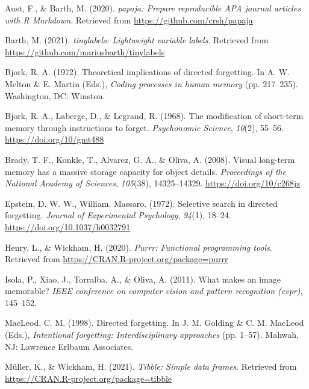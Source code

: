 \documentclass[
  english,
  man,floatsintext]{apa6}
\begin{document}
\leavevmode\hypertarget{ref-R-papaja}{}%
Aust, F., \& Barth, M. (2020). \emph{papaja: Prepare reproducible APA journal articles with R Markdown}. Retrieved from \url{https://github.com/crsh/papaja}

\leavevmode\hypertarget{ref-R-tinylabels}{}%
Barth, M. (2021). \emph{tinylabels: Lightweight variable labels}. Retrieved from \url{https://github.com/mariusbarth/tinylabels}

\leavevmode\hypertarget{ref-bjorkTheoreticalImplicationsDirected1972}{}%
Bjork, R. A. (1972). Theoretical implications of directed forgetting. In A. W. Melton \& E. Martin (Eds.), \emph{Coding processes in human memory} (pp. 217--235). Washington, DC: Winston.

\leavevmode\hypertarget{ref-bjorkModificationShorttermMemory1968}{}%
Bjork, R. A., Laberge, D., \& Legrand, R. (1968). The modification of short-term memory through instructions to forget. \emph{Psychonomic Science}, \emph{10}(2), 55--56. \url{https://doi.org/10/gmt488}

\leavevmode\hypertarget{ref-bradyVisualLongtermMemory2008}{}%
Brady, T. F., Konkle, T., Alvarez, G. A., \& Oliva, A. (2008). Visual long-term memory has a massive storage capacity for object details. \emph{Proceedings of the National Academy of Sciences}, \emph{105}(38), 14325--14329. \url{https://doi.org/10/c268jz}

\leavevmode\hypertarget{ref-EpsteinW1972}{}%
Epstein, D. W. W., William. Massaro. (1972). Selective search in directed forgetting. \emph{Journal of Experimental Psychology}, \emph{94}(1), 18--24. \url{https://doi.org/10.1037/h0032791}

\leavevmode\hypertarget{ref-R-purrr}{}%
Henry, L., \& Wickham, H. (2020). \emph{Purrr: Functional programming tools}. Retrieved from \url{https://CRAN.R-project.org/package=purrr}

\leavevmode\hypertarget{ref-Isola2011}{}%
Isola, P., Xiao, J., Torralba, A., \& Oliva, A. (2011). What makes an image memorable? \emph{IEEE conference on computer vision and pattern recognition (cvpr)}, 145--152.

\leavevmode\hypertarget{ref-macleodDirectedForgetting1998}{}%
MacLeod, C. M. (1998). Directed forgetting. In J. M. Golding \& C. M. MacLeod (Eds.), \emph{Intentional forgetting: Interdisciplinary approaches} (pp. 1--57). Mahwah, NJ: Lawrence Erlbaum Associates.

\leavevmode\hypertarget{ref-R-tibble}{}%
Müller, K., \& Wickham, H. (2021). \emph{Tibble: Simple data frames}. Retrieved from \url{https://CRAN.R-project.org/package=tibble}
\end{document}
